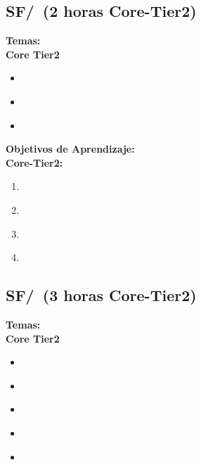 \subsection{SF/\SFResourceAllocationandScheduling~(2 horas Core-Tier2)}\label{sec:BOK:SFResourceAllocationandScheduling}
\noindent \textbf{Temas:}\\
\noindent \textbf{Core Tier2}
\begin{itemize}
	\item \SFResourceAllocationandSchedulingTopicKinds\label{sec:BOK:SFResourceAllocationandSchedulingTopicKinds}
	\item \SFResourceAllocationandSchedulingTopicKindsOf\label{sec:BOK:SFResourceAllocationandSchedulingTopicKindsOf}
	\item \SFResourceAllocationandSchedulingTopicAdvantages\label{sec:BOK:SFResourceAllocationandSchedulingTopicAdvantages}
\end{itemize}


\noindent \textbf{Objetivos de Aprendizaje:}\\
\noindent \textbf{Core-Tier2:}
\begin{enumerate}
	\setcounter{enumi}{0}
	\item \SFResourceAllocationandSchedulingLODefineHow\xspace[\SFResourceAllocationandSchedulingLODefineHowLevel]\label{sec:BOK:SFResourceAllocationandSchedulingLODefineHow}
	\item \SFResourceAllocationandSchedulingLODescribeTheBy\xspace[\SFResourceAllocationandSchedulingLODescribeTheByLevel]\label{sec:BOK:SFResourceAllocationandSchedulingLODescribeTheBy}
	\item \SFResourceAllocationandSchedulingLOImplementSimple\xspace[\SFResourceAllocationandSchedulingLOImplementSimpleLevel]\label{sec:BOK:SFResourceAllocationandSchedulingLOImplementSimple}
	\item \SFResourceAllocationandSchedulingLOUseFigures\xspace[\SFResourceAllocationandSchedulingLOUseFiguresLevel]\label{sec:BOK:SFResourceAllocationandSchedulingLOUseFigures}
\end{enumerate}


\subsection{SF/\SFProximity~(3 horas Core-Tier2)}\label{sec:BOK:SFProximity}
\noindent \textbf{Temas:}\\
\noindent \textbf{Core Tier2}
\begin{itemize}
	\item \SFProximityTopicSpeed\label{sec:BOK:SFProximityTopicSpeed}
	\item \SFProximityTopicLatencies\label{sec:BOK:SFProximityTopicLatencies}
	\item \SFProximityTopicCaches\label{sec:BOK:SFProximityTopicCaches}
	\item \SFProximityTopicCachesAnd\label{sec:BOK:SFProximityTopicCachesAnd}
	\item \SFProximityTopicIntroduction\label{sec:BOK:SFProximityTopicIntroduction}
\end{itemize}


